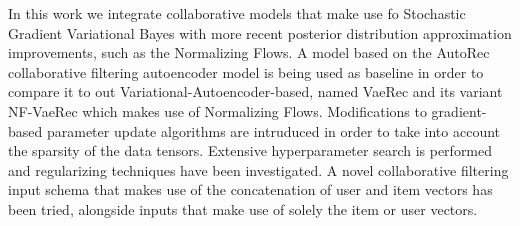 In this work we integrate collaborative models that make use fo Stochastic Gradient
Variational Bayes with more recent posterior distribution approximation improvements,
such as the Normalizing Flows.
A model based on the AutoRec collaborative filtering autoencoder model is being
used as baseline in order to compare it to out Variational-Autoencoder-based, named VaeRec and
its variant NF-VaeRec which makes use of Normalizing Flows.
Modifications to gradient-based parameter update algorithms are intruduced
in order to take into account the sparsity of the data tensors.
Extensive hyperparameter search is performed and regularizing techniques have been investigated.
A novel collaborative filtering input schema that makes use of the concatenation of user 
and item vectors has been tried, alongside inputs that make use of solely the item or user vectors.
